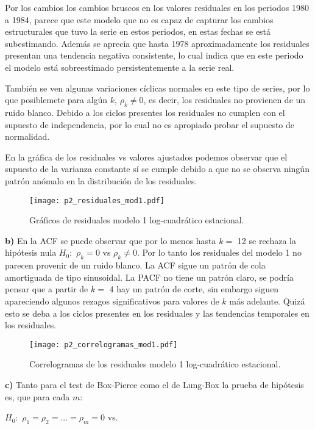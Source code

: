 \documentclass{tufte-handout}
\begin{document}
Por los cambios los cambios bruscos en los valores residuales en los periodos 1980 a 1984, parece que este modelo que no es capaz de capturar los cambios estructurales que tuvo la serie en estos periodos, en estas fechas se está subestimando. Además se aprecia que hasta 1978 aproximadamente los residuales presentan una tendencia negativa consistente, lo cual indica que en este periodo el modelo está sobreestimado persistentemente a la serie real.

También se ven algunas variaciones cíclicas normales en este tipo de series, por lo que posiblemete para algún $k$, $\rho_k \neq 0$, es decir, los residuales no provienen de un ruido blanco. Debido a los ciclos presentes los residuales no cumplen con el supuesto de independencia, por lo cual no es apropiado probar el supuesto de normalidad.

En la gráfica de los residuales vs valores ajustados podemos observar que el supuesto de la varianza constante sí se cumple debido a que no se observa ningún patrón anómalo en la distribución de los residuales.

\begin{figure*}
	\texttt{[image: p2\_residuales\_mod1.pdf]}
	\caption{Gráficos de residuales modelo 1 log-cuadrático estacional.}
	\label{fig:p2_residuales_mod1}
\end{figure*}

\textbf{b)} En la ACF se puede observar que por lo menos hasta $k=$ 12 se rechaza la hipótesis nula $H_0:$ $\rho_k = 0$ vs  $\rho_k \neq 0$. Por lo tanto los residuales del modelo 1 no parecen provenir de un ruido blanco. La ACF sigue un patrón de cola amortiguada de tipo sinusoidal. La PACF no tiene un patrón claro, se podría pensar que a partir de $k=$ 4 hay un patrón de corte, sin embargo siguen apareciendo algunos rezagos significativos para valores de $k$ más adelante. Quizá esto se deba a los ciclos presentes en los residuales y las tendencias temporales en los residuales.

\begin{figure*}
	\texttt{[image: p2\_correlogramas\_mod1.pdf]}
	\caption{Correlogramas de los residuales modelo 1 log-cuadrático estacional.}
	\label{fig:p2_correlogramas_mod1}
\end{figure*}

\textbf{c)} Tanto para el test de Box-Pierce como el de Lung-Box la prueba de hipótesis es, que para cada $m$:

$H_0:$ $\rho_1=\rho_2=...=\rho_m=0$ vs.
\end{document}
